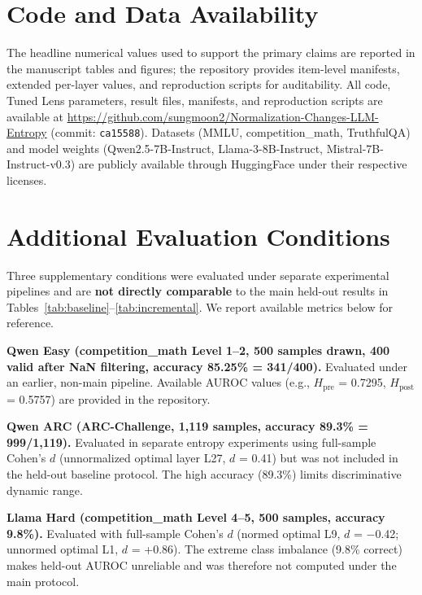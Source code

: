 \documentclass{ieeeaccess}
\newcommand{\Hpre}{H_{\text{pre}}}
\newcommand{\Hpost}{H_{\text{post}}}
\begin{document}
\section*{Code and Data Availability}

The headline numerical values used to support the primary claims are reported in the manuscript tables and figures; the repository provides item-level manifests, extended per-layer values, and reproduction scripts for auditability. All code, Tuned Lens parameters, result files, manifests, and reproduction scripts are available at \url{https://github.com/sungmoon2/Normalization-Changes-LLM-Entropy} (commit: \texttt{ca15588}). Datasets (MMLU, competition\_math, TruthfulQA) and model weights (Qwen2.5-7B-Instruct, Llama-3-8B-Instruct, Mistral-7B-Instruct-v0.3) are publicly available through HuggingFace under their respective licenses.

\FloatBarrier
\appendices

\section{Additional Evaluation Conditions}
\label{app:additional}

Three supplementary conditions were evaluated under separate experimental pipelines and are \textbf{not directly comparable} to the main held-out results in Tables~\ref{tab:baseline}--\ref{tab:incremental}. We report available metrics below for reference.

\textbf{Qwen Easy (competition\_math Level 1--2, 500 samples drawn, 400 valid after NaN filtering, accuracy 85.25\% = 341/400).} Evaluated under an earlier, non-main pipeline. Available AUROC values (e.g., $\Hpre$ = 0.7295, $\Hpost$ = 0.5757) are provided in the repository.

\textbf{Qwen ARC (ARC-Challenge, 1,119 samples, accuracy 89.3\% = 999/1,119).} Evaluated in separate entropy experiments using full-sample Cohen's $d$ (unnormalized optimal layer L27, $d$ = 0.41) but was not included in the held-out baseline protocol. The high accuracy (89.3\%) limits discriminative dynamic range.

\textbf{Llama Hard (competition\_math Level 4--5, 500 samples, accuracy 9.8\%).} Evaluated with full-sample Cohen's $d$ (normed optimal L9, $d$ = $-$0.42; unnormed optimal L1, $d$ = +0.86). The extreme class imbalance (9.8\% correct) makes held-out AUROC unreliable and was therefore not computed under the main protocol.
\end{document}

